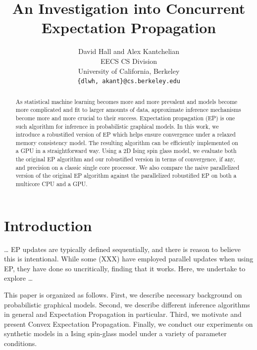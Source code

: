 \documentclass[times, 10pt,twocolumn]{article}
\begin{document}
\title{An Investigation into Concurrent Expectation Propagation}

\author{David Hall and Alex Kantchelian \\
EECS CS Division \\ University of California, Berkeley\\ \texttt{\{dlwh,
akant\}@cs.berkeley.edu}\\
}

\maketitle
\thispagestyle{empty}

\begin{abstract}
As statistical machine learning becomes more and more prevalent and models become more complicated and fit to larger amounts of data, approximate inference mechanisms become more and more crucial to their success. Expectation propagation (EP) is one such algorithm for inference in probabilistic graphical models. In this work, we introduce a robustified version of EP which helps ensure convergence under a relaxed memory consistency model. The resulting algorithm can be efficiently implemented on a GPU in a straightforward way. Using a 2D Ising spin glass model, we evaluate both the original EP algorithm and our robustified version in terms of convergence, if any, and precision on a classic single core processor. We also compare the naive parallelized version of the original EP algorithm against the parallelized robustified EP on both a multicore CPU and a GPU.
\end{abstract}



\section{Introduction}

\ldots
EP updates are typically defined sequentially,
and there is reason to believe this is intentional.
While some (XXX) have employed parallel updates when using EP, they
have done so uncritically, finding that it works. Here, we
undertake to explore
\ldots

This paper is organized as follows. First, we describe necessary
background on probabilistic graphical models. Second, we describe
different inference algorithms in general and Expectation Propagation
in particular. Third, we motivate and present Convex Expectation
Propagation. Finally, we conduct our experiments on synthetic
models in a Ising spin-glass model under a variety of parameter
conditions.
\end{document}
